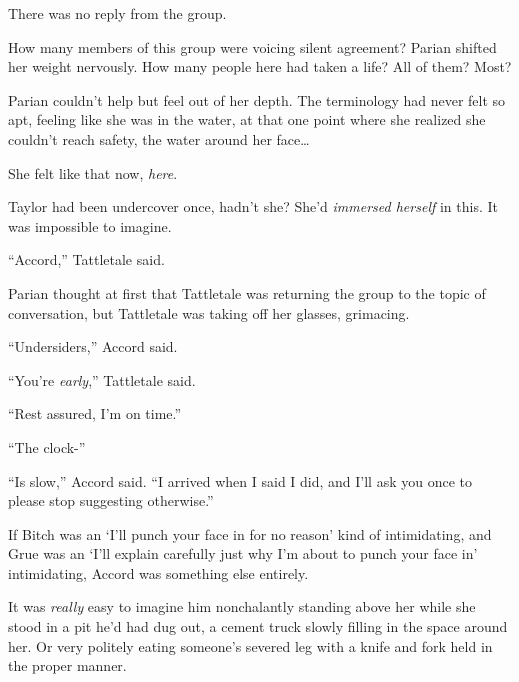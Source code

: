 There was no reply from the group.



How many members of this group were voicing silent agreement?  Parian shifted her weight nervously.  How many people here had taken a life?  All of them?  Most?



Parian couldn't help but feel out of her depth.  The terminology had never felt so apt, feeling like she was in the water, at that one point where she realized she couldn't reach safety, the water around her face\ldots



She felt like that now, \emph{here}.



Taylor had been undercover once, hadn't she?  She'd \emph{immersed herself} in this.  It was impossible to imagine.



``Accord,'' Tattletale said.



Parian thought at first that Tattletale was returning the group to the topic of conversation, but Tattletale was taking off her glasses, grimacing.



``Undersiders,'' Accord said.



``You're \emph{early},'' Tattletale said.



``Rest assured, I'm on time.''



``The clock-''



``Is slow,'' Accord said.  ``I arrived when I said I did, and I'll ask you once to please stop suggesting otherwise.''



If Bitch was an `I'll punch your face in for no reason' kind of intimidating, and Grue was an `I'll explain carefully just why I'm about to punch your face in' intimidating, Accord was something else entirely.



It was \emph{really} easy to imagine him nonchalantly standing above her while she stood in a pit he'd had dug out, a cement truck slowly filling in the space around her.  Or very politely eating someone's severed leg with a knife and fork held in the proper manner.



